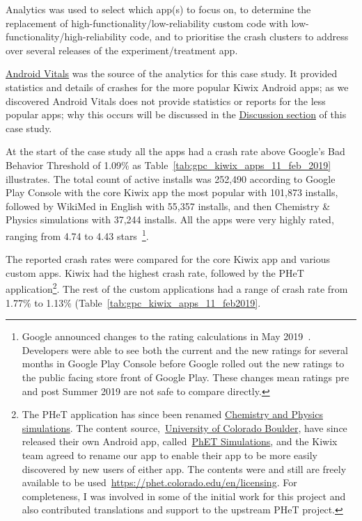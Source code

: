 Analytics was used to select which app(s) to focus on, to determine the replacement of high-functionality/low-reliability custom code with low-functionality/high-reliability code, and to prioritise the crash clusters to address over several releases of the experiment/treatment app.

\href{glossary_android_vitals}{Android Vitals} was the source of the analytics for this case study. It provided statistics and details of crashes for the more popular Kiwix Android apps; as we discovered Android Vitals does not provide statistics or reports for the less popular apps; why this occurs will be discussed in the \href{case-study-kiwix-discussion}{Discussion section} of this case study. 


At the start of the case study all the apps had a crash rate above Google's Bad Behavior Threshold of 1.09\% as Table~\ref{tab:gpc_kiwix_apps_11_feb_2019} illustrates. The total count of active installs was 252,490 according to Google Play Console with the core Kiwix app the most popular with 101,873 installs, followed by WikiMed in English with 55,357 installs, and then Chemistry \& Physics simulations with 37,244 installs. All the apps were very highly rated, ranging from 4.74 to 4.43 stars~\footnote{Google announced changes to the rating calculations in May 2019~\citep{androiddevelopersblog2019_io2019_whats_new_in_play}. Developers were able to see both the current and the new ratings for several months in Google Play Console before Google rolled out the new ratings to the public facing store front of Google Play. These changes mean ratings pre and post Summer 2019 are not safe to compare directly.}.

The reported crash rates were compared for the core Kiwix app and various custom apps. Kiwix had the highest crash rate, followed by the PHeT application\footnote{The PHeT application has since been renamed \href{https://play.google.com/store/apps/details?id=org.kiwix.kiwixcustomphet}{Chemistry and Physics simulations}. The content source,~\href{https://phet.colorado.edu/}{University of Colorado Boulder}, have since released their own Android app, called~\href{https://play.google.com/store/apps/details?id=edu.colorado.phet.androidApp}{PhET Simulations}, and the Kiwix team agreed to rename our app to enable their app to be more easily discovered by new users of either app. The contents were and still are freely available to be used~\url{https://phet.colorado.edu/en/licensing}. For completeness, I was involved in some of the initial work for this project and also contributed translations and support to the upstream PHeT project.}.
%
The rest of the custom applications had a range of crash rate from 1.77\% to 1.13\% (Table~\ref{tab:gpc_kiwix_apps_11_feb2019}.

